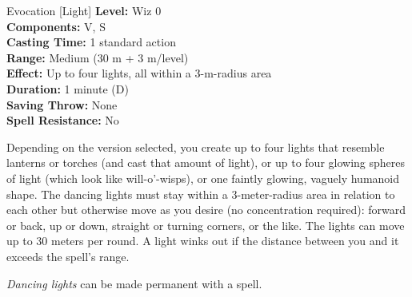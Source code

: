 {Evocation [Light]}
{
	\textbf{Level:}
	Wiz 0\\
	\textbf{Components:}
	V, S\\
	\textbf{Casting Time:}
	1 standard action\\
	\textbf{Range:}
	Medium (30 m + 3 m/level)\\
	\textbf{Effect:}
	Up to four lights, all within a 3-m-radius area\\
	\textbf{Duration:}
	1 minute (D)\\
	\textbf{Saving Throw:}
	None\\
	\textbf{Spell Resistance:}
	No\\
}
{
	Depending on the version selected, you create up to four lights that resemble lanterns or torches (and cast that amount of light), or up to four glowing spheres of light (which look like will-o'-wisps), or one faintly glowing, vaguely humanoid shape. The dancing lights must stay within a 3-meter-radius area in relation to each other but otherwise move as you desire (no concentration required): forward or back, up or down, straight or turning corners, or the like. The lights can move up to 30 meters per round. A light winks out if the distance between you and it exceeds the spell's range.

	\emph{Dancing lights} can be made permanent with a  spell.

}
